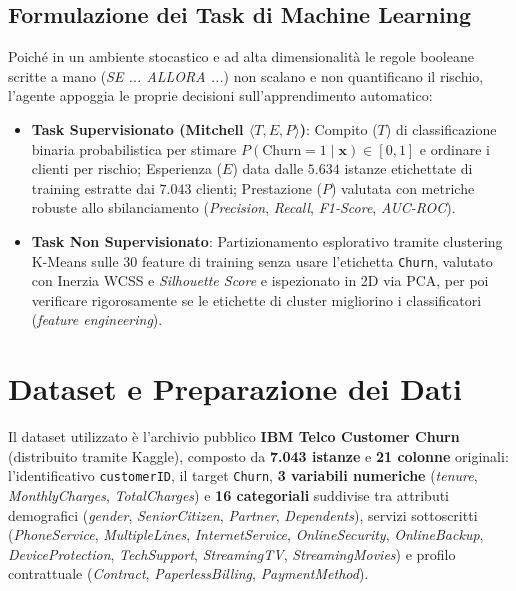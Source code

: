 \documentclass[11pt,a4paper]{article}
\begin{document}
\subsection{Formulazione dei Task di Machine Learning}
Poiché in un ambiente stocastico e ad alta dimensionalità le regole booleane scritte a mano (\textit{SE ... ALLORA ...}) non scalano e non quantificano il rischio, l'agente appoggia le proprie decisioni sull'apprendimento automatico:
\begin{itemize}
    \item \textbf{Task Supervisionato (Mitchell $\langle T, E, P \rangle$)}: Compito ($T$) di classificazione binaria probabilistica per stimare $P(\text{Churn}=1 \mid \mathbf{x}) \in [0, 1]$ e ordinare i clienti per rischio; Esperienza ($E$) data dalle $5.634$ istanze etichettate di training estratte dai $7.043$ clienti; Prestazione ($P$) valutata con metriche robuste allo sbilanciamento (\textit{Precision}, \textit{Recall}, \textit{F1-Score}, \textit{AUC-ROC}).
    \item \textbf{Task Non Supervisionato}: Partizionamento esplorativo tramite clustering K-Means sulle $30$ feature di training senza usare l'etichetta \texttt{Churn}, valutato con Inerzia WCSS e \textit{Silhouette Score} e ispezionato in 2D via PCA, per poi verificare rigorosamente se le etichette di cluster migliorino i classificatori (\textit{feature engineering}).
\end{itemize}

\section{Dataset e Preparazione dei Dati}
Il dataset utilizzato è l'archivio pubblico \textbf{IBM Telco Customer Churn} (distribuito tramite Kaggle), composto da \textbf{7.043 istanze} e \textbf{21 colonne} originali: l'identificativo \texttt{customerID}, il target \texttt{Churn}, \textbf{3 variabili numeriche} (\textit{tenure}, \textit{MonthlyCharges}, \textit{TotalCharges}) e \textbf{16 categoriali} suddivise tra attributi demografici (\textit{gender}, \textit{SeniorCitizen}, \textit{Partner}, \textit{Dependents}), servizi sottoscritti (\textit{PhoneService}, \textit{MultipleLines}, \textit{InternetService}, \textit{OnlineSecurity}, \textit{OnlineBackup}, \textit{DeviceProtection}, \textit{TechSupport}, \textit{StreamingTV}, \textit{StreamingMovies}) e profilo contrattuale (\textit{Contract}, \textit{PaperlessBilling}, \textit{PaymentMethod}).
\end{document}

